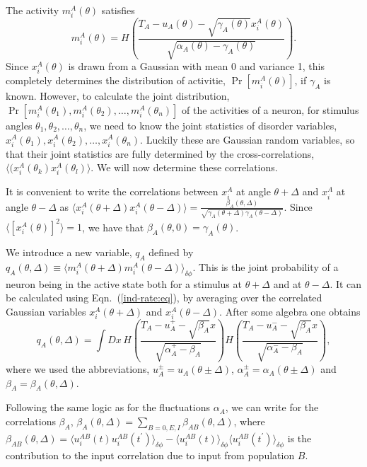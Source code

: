 The activity $m_i^A(\theta)$ satisfies
\begin{equation}
m_i^A(\theta)=H\left(\frac{T_A-u_A(\theta)-\sqrt{\gamma_A(\theta)}
x_i^A(\theta)}{\sqrt{\alpha_A(\theta)-\gamma_A(\theta)}}\right).
\label{ind-rate:eq}
\end{equation}
Since $x_i^A(\theta)$ is drawn from a Gaussian with mean 0 and variance 1,
this completely determines the distribution of activitie, $\Pr[m_i^A(\theta)]$, 
 if $\gamma_A$ is known. However, to calculate the joint distribution,
$\Pr[m_i^A(\theta_1),m_i^A(\theta_2),\ldots,m_i^A(\theta_n)]$ of the activities
of a neuron, for stimulus angles $\theta_1,\theta_2,\ldots,\theta_n$, we 
need to know the joint statistics of disorder variables, $x_i^A(\theta_1),
x_i^A(\theta_2),\ldots,x_i^A(\theta_n)$\@. Luckily these are Gaussian random
variables, so that their joint statistics are fully determined by the 
cross-correlations, $\langle(x_i^A(\theta_k)x_i^A(\theta_l)\rangle$\@.
We will now determine these correlations.

It is convenient to write the correlations between $x_i^A$ at angle 
$\theta+\Delta$ and $x_i^A$ at angle $\theta-\Delta$ as
$\langle x_i^A(\theta+\Delta)x_i^A(\theta-\Delta)\rangle=
\frac{\beta_A(\theta,\Delta)}
{\sqrt{\gamma_A(\theta+\Delta)\gamma_A(\theta-\Delta)}}$\@. Since
$\langle [x_i^A(\theta)]^2\rangle=1$, we have that 
$\beta_A(\theta,0)=\gamma_A(\theta)$\@.

We introduce a new variable, $q_A$ defined by $q_A(\theta,\Delta)\equiv
\langle m_i^A(\theta+\Delta)m_i^A(\theta-\Delta)\rangle_{\delta\phi}$\@.
This is the joint probability of a neuron being in the active state both
for a stimulus at $\theta+\Delta$ and at $\theta-\Delta$.
It can be calculated using Eqn.~(\ref{ind-rate:eq}), by averaging over 
the correlated Gaussian variables $x_i^A(\theta+\Delta)$ and 
$x_i^A(\theta-\Delta)$\@. After some algebra one obtains
\begin{equation}
q_{A}(\theta,\Delta) = 
\int\!Dx\, H\left(\frac{T_A-u_A^+-\sqrt{\beta_A}x}
{\sqrt{\alpha_A^+-\beta_A}}\right)
H\left(\frac{T_A-u_A^--\sqrt{\beta_A}x}
{\sqrt{\alpha_A^--\beta_A}}\right),
\label{qA:eq}
\end{equation}
where we used the abbreviations, $u_A^\pm=u_{A}(\theta\pm\Delta)$,
$\alpha_A^\pm=\alpha_{A}(\theta\pm\Delta)$ and
$\beta_A=\beta_{A}(\theta,\Delta)$\@.

Following the same logic as for the fluctuations $\alpha_A$, we can write for
the correlations $\beta_{A}$, $\beta_{A}(\theta,\Delta)=
\sum_{B=0,E,I}\beta_{AB}(\theta,\Delta)$, where 
$\beta_{AB}(\theta,\Delta)=
\langle u_i^{AB}(t)u_i^{AB}(t^\prime)\rangle_{\delta\phi}-
\langle u_i^{AB}(t)\rangle_{\delta\phi}
\langle u_i^{AB}(t^\prime)\rangle_{\delta\phi}$ is the 
contribution to the input correlation due to input from population $B$\@.

